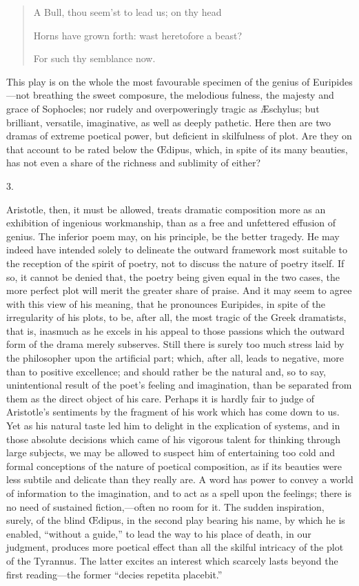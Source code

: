 \begin{quote}

A Bull, thou seem'st to lead us; on thy head

Horns have grown forth: wast heretofore a beast?

For such thy semblance now.

\end{quote}

This play is on the whole the most favourable specimen of the
genius of Euripides—not breathing the sweet composure, the melodious
fulness, the majesty and grace of Sophocles; nor rudely and
overpoweringly tragic as Æschylus; but brilliant, versatile,
imaginative, as well as deeply pathetic. Here then are two dramas of
extreme poetical power, but deficient in skilfulness of plot. Are they
on that account to be rated below the Œdipus, which, in spite of its
many beauties, has not even a share of the richness and sublimity of
either?

3.

Aristotle, then, it must be allowed, treats dramatic composition
more as an exhibition of ingenious workmanship, than as a free and
unfettered effusion of genius. The inferior poem may, on his
principle, be the better tragedy. He may indeed have intended solely
to delineate the outward framework most suitable to the reception of
the spirit of poetry, not to discuss the nature of poetry itself.
If so, it cannot be denied that, the poetry being given equal in the
two cases, the more perfect plot will merit the greater share of
praise. And it may seem to agree with this view of his meaning, that
he pronounces Euripides, in spite of the irregularity of his plots, to
be, after all, the most tragic of the Greek dramatists, that is,
inasmuch as he excels in his appeal to those passions which the
outward form of the drama merely subserves. Still there is surely too
much stress laid by the philosopher upon the artificial part; which,
after all, leads to negative, more than to positive excellence; and
should rather be the natural and, so to say, unintentional result of
the poet's feeling and imagination, than be separated from them as the
direct object of his care. Perhaps it is hardly fair to judge of
Aristotle's sentiments by the fragment of his work which has come down
to us. Yet as his natural taste led him to delight in the explication
of systems, and in those absolute decisions which came of his vigorous
talent for thinking through large subjects, we may be allowed to
suspect him of entertaining too cold and formal conceptions of the
nature of poetical composition, as if its beauties were less subtile
and delicate than they really are. A word has power to convey a world
of information to the imagination, and to act as a spell upon the
feelings; there is no need of sustained fiction,—often no room for
it. The sudden inspiration, surely, of the blind Œdipus, in the
second play bearing his name, by which he is enabled, ``without a
guide,'' to lead the way to his place of death, in our judgment,
produces more poetical effect than all the skilful intricacy of the
plot of the Tyrannus. The latter excites an interest which scarcely
lasts beyond the first reading—the former ``decies repetita
placebit.''

